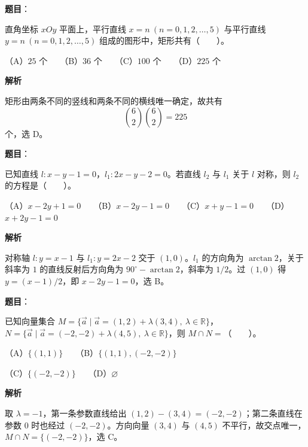 \begin{answer}

\textbf{题目}：

直角坐标 $xOy$ 平面上，平行直线 $x=n\ (n=0,1,2,\ldots,5)$ 与平行直线 $y=n\ (n=0,1,2,\ldots,5)$ 组成的图形中，矩形共有\mbox{（　　）}。

（A）$25$ 个　　（B）$36$ 个　　（C）$100$ 个　　（D）$225$ 个

\textbf{解析}

矩形由两条不同的竖线和两条不同的横线唯一确定，故共有
\nopagebreak[4]
\[
\binom62\binom62=225
\]
个，选 D。


\end{answer}
\begin{answer}

\textbf{题目}：

已知直线 $l:x-y-1=0$，$l_1:2x-y-2=0$。若直线 $l_2$ 与 $l_1$ 关于 $l$ 对称，则 $l_2$ 的方程是\mbox{（　　）}。

（A）$x-2y+1=0$　　（B）$x-2y-1=0$　　（C）$x+y-1=0$　　（D）$x+2y-1=0$

\textbf{解析}

对称轴 $l:y=x-1$ 与 $l_1:y=2x-2$ 交于 $(1,0)$。$l_1$ 的方向角为 $\arctan2$，关于斜率为 $1$ 的直线反射后方向角为 $90^\circ-\arctan2$，斜率为 $1/2$。过 $(1,0)$ 得 $y=(x-1)/2$，即 $x-2y-1=0$，选 B。


\end{answer}
\begin{answer}

\textbf{题目}：

已知向量集合 $M=\{\vec a\mid\vec a=(1,2)+\lambda(3,4),\ \lambda\in\mathbb{R}\}$，$N=\{\vec a\mid\vec a=(-2,-2)+\lambda(4,5),\ \lambda\in\mathbb{R}\}$，则 $M\cap N=$\mbox{（　　）}。

（A）$\{(1,1)\}$　　（B）$\{(1,1),(-2,-2)\}$

（C）$\{(-2,-2)\}$　　（D）$\varnothing$

\textbf{解析}

取 $\lambda=-1$，第一条参数直线给出 $(1,2)-(3,4)=(-2,-2)$；第二条直线在参数 $0$ 时也经过 $(-2,-2)$。方向向量 $(3,4)$ 与 $(4,5)$ 不平行，故交点唯一，$M\cap N=\{(-2,-2)\}$，选 C。


\end{answer}
